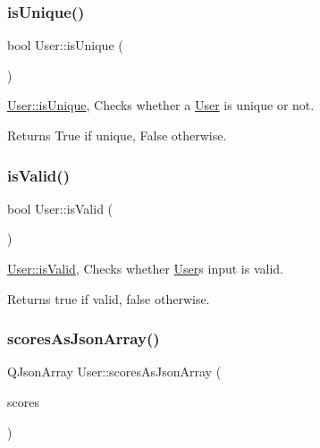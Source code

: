 \subsubsection{\texorpdfstring{is\+Unique()}{isUnique()}}
{\footnotesize\ttfamily bool User\+::is\+Unique (\begin{DoxyParamCaption}{ }\end{DoxyParamCaption})}



\hyperlink{classUser_a9e1fe4ac5c94a98f82ca09fa0982e029}{User\+::is\+Unique}, Checks whether a \hyperlink{classUser}{User} is unique or not. 

\begin{DoxyReturn}{Returns}
True if unique, False otherwise. 
\end{DoxyReturn}
\mbox{\label{classUser_a7fff50444765760051f4ae6fb3d58e16}} 
\subsubsection{\texorpdfstring{is\+Valid()}{isValid()}}
{\footnotesize\ttfamily bool User\+::is\+Valid (\begin{DoxyParamCaption}{ }\end{DoxyParamCaption})}



\hyperlink{classUser_a7fff50444765760051f4ae6fb3d58e16}{User\+::is\+Valid}, Checks whether \hyperlink{classUser}{User}\textquotesingle{}s input is valid. 

\begin{DoxyReturn}{Returns}
true if valid, false otherwise. 
\end{DoxyReturn}
\mbox{\label{classUser_af14a1fba45613d9586d8951f13f9c4a0}} 
\subsubsection{\texorpdfstring{scores\+As\+Json\+Array()}{scoresAsJsonArray()}}
{\footnotesize\ttfamily Q\+Json\+Array User\+::scores\+As\+Json\+Array (\begin{DoxyParamCaption}\item[{Q\+Vector$<$ int $>$ \&}]{scores }\end{DoxyParamCaption})}




